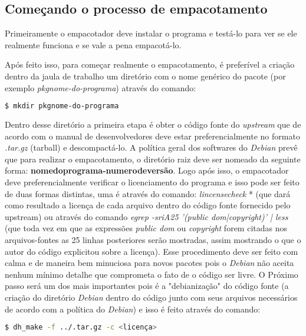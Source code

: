 \subsection{Começando o processo de empacotamento}

Primeiramente o empacotador deve instalar o programa e testá-lo para ver se ele realmente funciona e se vale a pena empacotá-lo.

Após feito isso, para começar realmente o empacotamento, é preferível a criação dentro da jaula de trabalho um diretório com o nome genérico do pacote (por exemplo \textit{pkgnome-do-programa}) através do comando:

\begin{lstlisting}[language=bash]
	$ mkdir pkgnome-do-programa 
\end{lstlisting} 

Dentro desse diretório a primeira etapa é obter o código fonte do \textit{upstream} que de acordo com o manual de desenvolvedores deve estar preferencialmente no formato \textit{.tar.gz} (tarball) e descompactá-lo. A política geral dos softwares do \textit{Debian} prevê que para realizar o empacotamento, o diretório raiz deve ser nomeado da seguinte forma: \textbf{nomedoprograma-numerodeversão}. Logo após isso, o empacotador deve preferencialmente verificar o licenciamento do programa e isso pode ser feito de duas formas distintas, uma é através do comando: \textit{lincensecheck} * (que dará como resultado a licença de cada arquivo dentro do código fonte fornecido pelo upstream) ou através do comando\textit{ egrep -sriA25 '(public dom|copyright)' | less} (que toda vez em que as expressões \textit{public dom} ou \textit{copyright} forem citadas nos arquivos-fontes as 25 linhas posteriores serão mostradas, assim mostrando o que o autor do código explicitou sobre a licença). Esse procedimento deve ser feito com calma e de maneira bem minuciosa para novos pacotes pois o \textit{Debian} não aceita nenhum mínimo detalhe que comprometa o fato de o código ser livre.
O Próximo passo será um dos mais importantes pois é a "debianização" do código fonte (a criação do diretório \textit{Debian} dentro do código junto com seus arquivos necessários de acordo com a política do \textit{Debian}) e isso é feito através do comando:

\begin{lstlisting}[language=bash]
	$ dh_make -f ../.tar.gz -c <licença> 
\end{lstlisting} 

